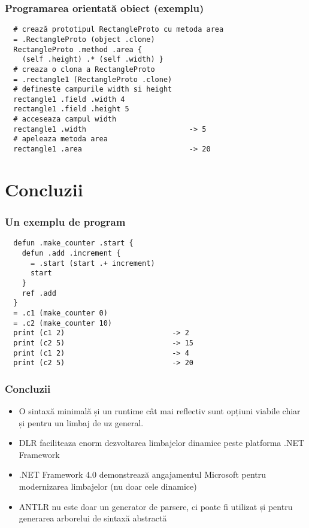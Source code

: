 \documentclass{beamer}
\begin{document}
\begin{frame}[containsverbatim]
  \frametitle{Programarea orientată obiect (exemplu)}
  \color{blue}
  \begin{verbatim}
  # crează prototipul RectangleProto cu metoda area
  = .RectangleProto (object .clone)
  RectangleProto .method .area { 
    (self .height) .* (self .width) }
  # creaza o clona a RectangleProto
  = .rectangle1 (RectangleProto .clone)
  # defineste campurile width si height
  rectangle1 .field .width 4
  rectangle1 .field .height 5
  # acceseaza campul width
  rectangle1 .width                        -> 5
  # apeleaza metoda area
  rectangle1 .area                         -> 20\end{verbatim}
  \color{black}

\end{frame}

\section{Concluzii}

\begin{frame}[containsverbatim]
  \frametitle{Un exemplu de program}
  \color{blue}
  \begin{verbatim}
  defun .make_counter .start {
    defun .add .increment {
      = .start (start .+ increment)
      start
    }
    ref .add
  }
  = .c1 (make_counter 0)
  = .c2 (make_counter 10)
  print (c1 2)                         -> 2
  print (c2 5)                         -> 15
  print (c1 2)                         -> 4
  print (c2 5)                         -> 20
  \end{verbatim}
  \color{black}
\end{frame}

\begin{frame}
  \frametitle{Concluzii}
  \begin{itemize}
  \item
    O sintaxă minimală și un runtime cât mai reflectiv sunt opțiuni viabile chiar și pentru un limbaj de uz general.
  \item
    DLR faciliteaza enorm dezvoltarea limbajelor dinamice peste platforma .NET Framework
  \item 
    .NET Framework 4.0 demonstrează angajamentul Microsoft pentru modernizarea limbajelor (nu doar cele dinamice)
  \item
    ANTLR nu este doar un generator de parsere, ci poate fi utilizat și pentru generarea arborelui de sintaxă abstractă
  \end{itemize}
\end{frame}
\end{document}

